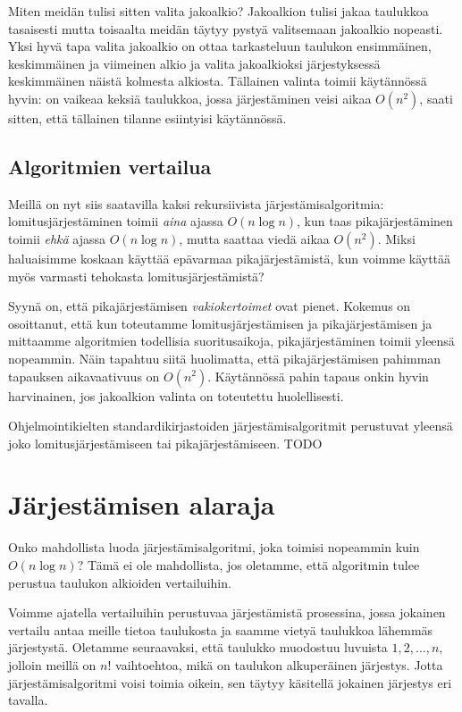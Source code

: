 Miten meidän tulisi sitten valita jakoalkio?
Jakoalkion tulisi jakaa taulukkoa tasaisesti mutta toisaalta
meidän täytyy pystyä valitsemaan jakoalkio nopeasti.
Yksi hyvä tapa valita jakoalkio on ottaa tarkasteluun
taulukon ensimmäinen, keskimmäinen ja viimeinen alkio ja valita
jakoalkioksi järjestyksessä keskimmäinen näistä kolmesta alkiosta.
Tällainen valinta toimii käytännössä hyvin:
on vaikeaa keksiä taulukkoa, jossa järjestäminen veisi aikaa $O(n^2)$,
saati sitten, että tällainen tilanne esiintyisi käytännössä.

\subsection{Algoritmien vertailua}

Meillä on nyt siis saatavilla kaksi rekursiivista järjestämisalgoritmia:
lomitusjärjestäminen toimii \emph{aina} ajassa $O(n \log n)$,
kun taas pikajärjestäminen toimii \emph{ehkä} ajassa $O(n \log n)$,
mutta saattaa viedä aikaa $O(n^2)$.
Miksi haluaisimme koskaan käyttää epävarmaa pikajärjestämistä,
kun voimme käyttää myös varmasti tehokasta lomitusjärjestämistä?

Syynä on, että pikajärjestämisen \emph{vakiokertoimet} ovat pienet.
Kokemus on osoittanut, että kun toteutamme lomitusjärjestämisen ja
pikajärjestämisen ja mittaamme algoritmien todellisia suoritusaikoja,
pikajärjestäminen toimii yleensä nopeammin.
Näin tapahtuu siitä huolimatta, että pikajärjestämisen pahimman
tapauksen aikavaativuus on $O(n^2)$.
Käytännössä pahin tapaus onkin hyvin harvinainen,
jos jakoalkion valinta on toteutettu huolellisesti.

Ohjelmointikielten standardikirjastoiden järjestämisalgoritmit
perustuvat yleensä joko lomitusjärjestämiseen tai pikajärjestämiseen.
TODO

\section{Järjestämisen alaraja}

Onko mahdollista luoda järjestämisalgoritmi, joka toimisi
nopeammin kuin $O(n \log n)$?
Tämä ei ole mahdollista, jos oletamme, että algoritmin
tulee perustua taulukon alkioiden vertailuihin.

Voimme ajatella vertailuihin perustuvaa järjestämistä
prosessina, jossa jokainen vertailu antaa meille tietoa
taulukosta ja saamme vietyä taulukkoa lähemmäs järjestystä.
Oletamme seuraavaksi, että taulukko muodostuu luvuista
$1,2,\dots,n$, jolloin meillä on $n!$ vaihtoehtoa, mikä
on taulukon alkuperäinen järjestys.
Jotta järjestämisalgoritmi voisi toimia oikein,
sen täytyy käsitellä jokainen järjestys eri tavalla.

